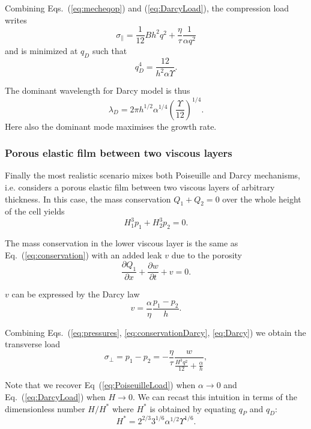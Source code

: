 \documentclass[twocolumn,superscriptaddress,showpacs,preprintnumbers,
amsmath,amssymb,prl]{revtex4-1}
\begin{document}
Combining Eqs.~(\ref{eq:mecheqop}) and (\ref{eq:DarcyLoad}), the compression load writes
\begin{equation}
\sigma_\parallel = \frac{1}{12}B h^2 q^2 + \frac{\eta}{\tau}\frac{1}{\alpha q^2}
\label{eq:sigma0D}
\end{equation}
and is minimized at $q_D$ such that
\begin{equation}
q_D^4 = \frac{12}{h^2\alpha\Upsilon}.
\label{eq:qD}
\end{equation}

The dominant wavelength for Darcy model is thus
\begin{equation}
\lambda_D = 2\pi h^{1/2}\alpha^{1/4}\left(\frac{\Upsilon}{12}\right)^{1/4}.
\end{equation}
Here also the dominant mode maximises the growth rate.


\subsubsection*{Porous elastic film between two viscous layers}
Finally the most realistic scenario mixes both Poiseuille and Darcy mechanisms, i.e. considers a porous elastic film between two viscous layers of arbitrary thickness. In this case, the mass conservation $Q_1 + Q_2 = 0$ over the whole height of the cell yields
\begin{equation}
H_1^3 p_1 + H_2^3 p_2 = 0.
\label{eq:pressures}
\end{equation}

The mass conservation in the lower viscous layer is the same as Eq.~(\ref{eq:conservation}) with an added leak $v$ due to the porosity
\begin{equation}
\frac{\partial Q_1}{\partial x} + \frac{\partial w}{\partial t} + v = 0.
\label{eq:conservationDarcy}
\end{equation}

$v$ can be expressed by the Darcy law
\begin{equation}
v = \frac{\alpha}{\eta} \frac{p_1-p_2}{h}.
\label{eq:Darcy}
\end{equation}

Combining Eqs.~(\ref{eq:pressures}, \ref{eq:conservationDarcy}, \ref{eq:Darcy}) we obtain the transverse load
\begin{equation}
\sigma_\perp = p_1-p_2 = - \frac{\eta}{\tau} \frac{w}{\frac{H^3 q^2}{12} + \frac{\alpha}{h}},
\label{eq:MixtLoad}
\end{equation}

Note that we recover Eq~(\ref{eq:PoiseuilleLoad}) when $\alpha \rightarrow 0$ and Eq.~(\ref{eq:DarcyLoad}) when $H \rightarrow 0$. We can recast this intuition in terms of the dimensionless number $H/H^*$ where $H^*$ is obtained by equating $q_P$ and $q_D$:
\begin{equation}
H^* = 2^{2/3} 3^{1/6} \alpha^{1/2} \Upsilon^{1/6}.
\end{equation}
\end{document}
